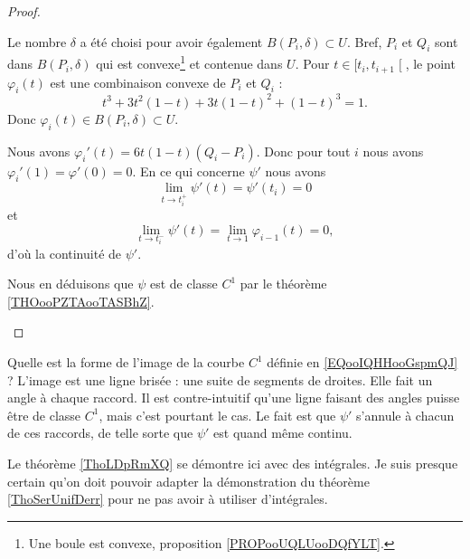 \begin{proof}
\begin{subproof}
		Le nombre \( \delta\) a été choisi pour avoir également \( B(P_i,\delta)\subset U\). Bref, \( P_i\) et \( Q_i\) sont dans \( B(P_i,\delta)\) qui est convexe\footnote{Une boule est convexe, proposition \ref{PROPooUQLUooDQfYLT}.} et contenue dans \( U\). Pour \( t\in \mathopen[ t_i , t_{i+1} \mathclose[\), le point \( \varphi_i(t)\) est une combinaison convexe de \( P_i\) et \( Q_i\) :
		\begin{equation}
			t^3+3t^2(1-t)+3t(1-t)^2+(1-t)^3=1.
		\end{equation}
		Donc \( \varphi_i(t)\in B(P_i,\delta)\subset U\).

		Nous avons \( \varphi_i'(t)=6t(1-t)(Q_i-P_i)\). Donc pour tout \( i\) nous avons \( \varphi_i'(1)=\varphi'(0)=0\). En ce qui concerne \( \psi'\) nous avons
		\begin{equation}
			\lim_{t\to t_i^+} \psi'(t)=\psi'(t_i)=0
		\end{equation}
		et
		\begin{equation}
			\lim_{t\to t_i^-} \psi'(t)=\lim_{t\to 1} \varphi_{i-1}(t)=0,
		\end{equation}
		d'où la continuité de \( \psi'\).

		Nous en déduisons que \( \psi\) est de classe \( C^1\) par le théorème \ref{THOooPZTAooTASBhZ}.
	\end{subproof}
\end{proof}

\begin{remark}
	Quelle est la forme de l'image de la courbe \( C^1\) définie en \eqref{EQooIQHHooGspmQJ} ? L'image est une ligne brisée : une suite de segments de droites. Elle fait un angle à chaque raccord. Il est contre-intuitif qu'une ligne faisant des angles puisse être de classe \( C^1\), mais c'est pourtant le cas. Le fait est que \( \psi'\) s'annule à chacun de ces raccords, de telle sorte que \( \psi'\) est quand même continu.
\end{remark}

\begin{probleme}
	Le théorème \ref{ThoLDpRmXQ} se démontre ici avec des intégrales. Je suis presque certain qu'on doit pouvoir adapter la démonstration du théorème \ref{ThoSerUnifDerr} pour ne pas avoir à utiliser d'intégrales.
\end{probleme}

